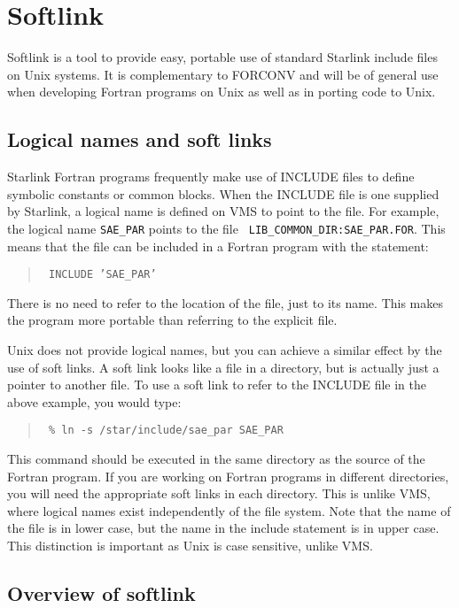 \section{Softlink}

Softlink is a tool to provide easy, portable use of standard Starlink include
files on Unix systems. It is complementary to FORCONV and will be of general
use when developing Fortran programs on Unix as well as in porting code to
Unix.

\subsection{Logical names and soft links}

Starlink Fortran programs frequently make use of INCLUDE files to define
symbolic constants or common blocks. When the INCLUDE file is one supplied by
Starlink, a logical name is defined on VMS to point to the file. For example,
the logical name {\tt SAE\_PAR} points to the file {\tt
LIB\_COMMON\_DIR:SAE\_PAR.FOR}. This means that the file can be included in a
Fortran program with the statement:

\begin{quote}{\tt
INCLUDE 'SAE\_PAR'
}
\end{quote}

There is no need to refer to the location of the file, just to its name. This
makes the program more portable than referring to the explicit file.

Unix does not provide logical names, but you can achieve a similar effect by
the use of soft links. A soft link looks like a file in a directory, but is
actually just a pointer to another file. To use a soft link to refer to the
INCLUDE file in the above example, you would type:

\begin{quote}{\tt
\% ln -s /star/include/sae\_par SAE\_PAR
}
\end{quote}

This command should be executed in the same directory as the source of the
Fortran program. If you are working on Fortran programs in different
directories, you will need the appropriate soft links in each directory. This
is unlike VMS, where logical names exist independently of the file system. Note
that the name of the file is in lower case, but the name in the include
statement is in upper case. This distinction is important as Unix is case
sensitive, unlike VMS.

\subsection{Overview of softlink}

